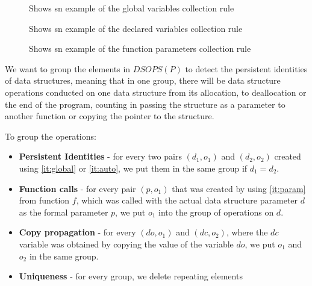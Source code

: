 \documentclass[a4paper,11pt]{article}
\begin{document}
        \begin{figure}[h]
            

            \caption{Shows sn example of the global variables collection rule}

            \label{fig:global-collection-rule}
        \end{figure}
        \begin{figure}[h]
            
            \caption{Shows sn example of the declared variables collection rule}

            \label{fig:declared-collection-rule}
        \end{figure}
        \begin{figure}[h]
            

            \caption{Shows sn example of the function parameters collection rule}

            \label{fig:parameter-collection-rule}
        \end{figure}

        \clearpage


		We want to group the elements in $DSOPS(P)$ to detect the persistent identities \cite{Okasaki} of
		data structures, meaning that in one group, there will be data structure operations conducted on one
		data structure from its allocation, to deallocation or the end of the program, counting in passing the structure as a
		parameter to another function or copying the pointer to the structure.

		To group the operations:
		\begin{itemize}

            \item \textbf{Persistent Identities} - for every two pairs $(d_1, o_1)$ and $(d_2, o_2)$ created using
                \autoref{it:global} or \autoref{it:auto}, we put them in the same group if $d_1 = d_2$.

            \item \textbf{Function calls} - for every pair $(p, o_1)$ that was created by using \autoref{it:param}
                from function $f$, which was called with the actual data structure parameter $d$ as the formal parameter
                $p$, we put $o_1$ into the group of operations on $d$.

            \item \textbf{Copy propagation} - for every $(do, o_1)$ and $(dc, o_2)$, where the $dc$ variable was
                obtained by copying the value of the variable $do$, we put $o_1$ and $o_2$ in the same group.

            \item \textbf{Uniqueness} - for every group, we delete repeating elements

		\end{itemize}
\end{document}
